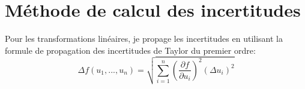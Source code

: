 \documentclass[a4paper, 11pt]{article}
\begin{document}
		\begin{table}[H]
			\centering
			\vspace{0.2cm}
			
			\caption{Propriétés physiques et cinématiques internes des amas stellaires. L'ensemble de ces données proviennent de Quintana et al. 2021. Ces valeurs ne sont pas disponibles pour les nuages moléculaires}
			\label{tab:annexe_masses_gradients}
		\end{table}
		
	\section{Méthode de calcul des incertitudes}
	\label{annexe:methode_incertitudes}
	Pour les transformations linéaires, je propage les incertitudes en utilisant la formule de propagation des incertitudes de Taylor \cite{taylor1997} du premier ordre:
	$$\Delta f(u_1,...,u_n) = \sqrt{\sum_{i=1}^{n} \left(\frac{\partial f}{\partial u_i} \right)^2 (\Delta u_i)^2}$$
	
\end{document}
